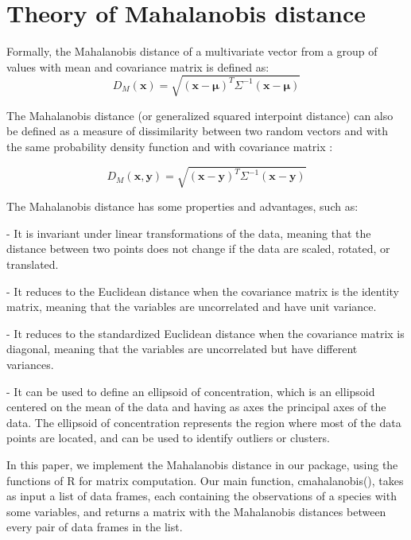 \documentclass[article]{jss}
\begin{document}
\section{Theory of Mahalanobis distance} \label{sec:models}

Formally, the Mahalanobis distance of a multivariate vector from a group of values with mean and covariance matrix is defined as: \cite{mahalanobis1936generalized}
%
\begin{equation} \label{eq:mean}
D_M(\mathbf{x})=\sqrt{(\mathbf{x}-\boldsymbol{\mu})^T\Sigma^{-1}(\mathbf{x}-\boldsymbol{\mu})}
\end{equation}
%

The Mahalanobis distance (or generalized squared interpoint distance) can also be defined as a measure of dissimilarity between two random vectors and with the same probability density function and with covariance matrix : \cite{de2016mahalanobis}

\begin{equation} \label{eq:mean}
D_M(\mathbf{x},\mathbf{y})=\sqrt{(\mathbf{x}-\mathbf{y})^T\Sigma^{-1}(\mathbf{x}-\mathbf{y})}
\end{equation}

The Mahalanobis distance has some properties and advantages, such as:
\begin{itemize}
- It is invariant under linear transformations of the data, meaning that the distance between two points does not change if the data are scaled, rotated, or translated.
\end{itemize}
\begin{itemize}
- It reduces to the Euclidean distance when the covariance matrix is the identity matrix, meaning that the variables are uncorrelated and have unit variance.
\end{itemize}
\begin{itemize}
- It reduces to the standardized Euclidean distance when the covariance matrix is diagonal, meaning that the variables are uncorrelated but have different variances.
\end{itemize}
\begin{itemize}
- It can be used to define an ellipsoid of concentration, which is an ellipsoid centered on the mean of the data and having as axes the principal axes of the data. The ellipsoid of concentration represents the region where most of the data points are located, and can be used to identify outliers or clusters.
\end{itemize}

In this paper, we implement the Mahalanobis distance in our package, using the  \cite{statspackage} functions of R for matrix computation. Our main function, cmahalanobis(), takes as input a list of data frames, each containing the observations of a species with some variables, and returns a matrix with the Mahalanobis distances between every pair of data frames in the list.
\end{document}
